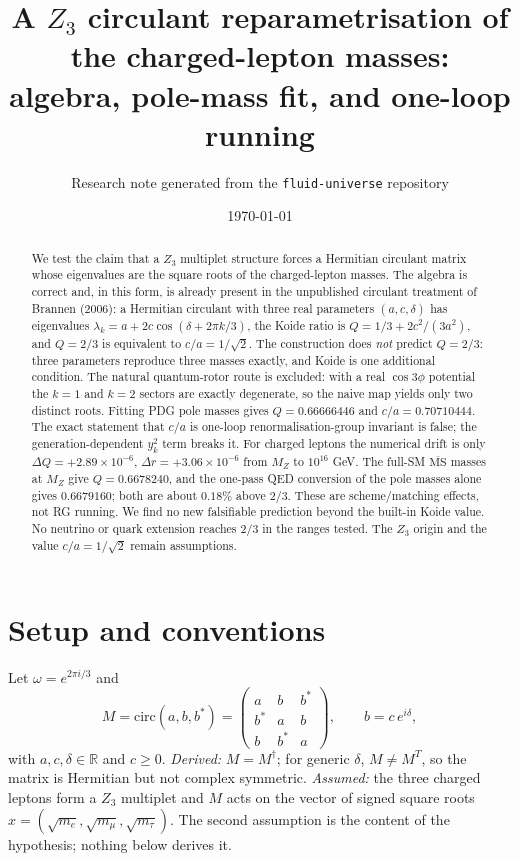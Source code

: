 \documentclass[11pt]{article}
\title{A $Z_3$ circulant reparametrisation of the charged-lepton masses:\\
algebra, pole-mass fit, and one-loop running}
\author{Research note generated from the \texttt{fluid-universe} repository}
\date{\today}
\begin{document}
\maketitle

\begin{abstract}
We test the claim that a $Z_3$ multiplet structure forces a Hermitian circulant
matrix whose eigenvalues are the square roots of the charged-lepton masses.
The algebra is correct and, in this form, is already present in the unpublished
circulant treatment of Brannen (2006): a Hermitian circulant with three real
parameters $(a,c,\delta)$ has eigenvalues
$\lambda_k=a+2c\cos(\delta+2\pi k/3)$, the Koide ratio is
$Q=1/3+2c^2/(3a^2)$, and $Q=2/3$ is equivalent to $c/a=1/\sqrt2$.
The construction does \emph{not} predict $Q=2/3$: three parameters reproduce
three masses exactly, and Koide is one additional condition. The natural
quantum-rotor route is excluded: with a real $\cos3\phi$ potential the $k=1$
and $k=2$ sectors are exactly degenerate, so the naive map yields only two
distinct roots. Fitting PDG pole
masses gives $Q=0.66666446$ and $c/a=0.70710444$. The exact statement that
$c/a$ is one-loop renormalisation-group invariant is false; the
generation-dependent $y_k^2$ term breaks it. For charged leptons the numerical
drift is only $\Delta Q=+2.89\times10^{-6}$, $\Delta r=+3.06\times10^{-6}$ from
$M_Z$ to $10^{16}$ GeV. The full-SM $\overline{\mathrm{MS}}$ masses at $M_Z$
give $Q=0.6678240$, and the one-pass QED conversion of the pole masses alone
gives $0.6679160$; both are about $0.18\%$ above $2/3$. These are
scheme/matching effects, not RG running. We find no new falsifiable prediction beyond the built-in Koide
value. No neutrino or quark extension reaches $2/3$ in the ranges tested. The
$Z_3$ origin and the value $c/a=1/\sqrt2$ remain assumptions.
\end{abstract}

\section{Setup and conventions}
\label{sec:setup}

Let $\omega=e^{2\pi i/3}$ and
\begin{equation}
M=\mathrm{circ}(a,b,b^*)
=\begin{pmatrix}
a & b & b^*\\
b^* & a & b\\
b & b^* & a
\end{pmatrix},
\qquad b=c\,e^{i\delta},
\label{eq:M}
\end{equation}
with $a,c,\delta\in\mathbb{R}$ and $c\ge0$. \emph{Derived:} $M=M^\dagger$; for
generic $\delta$, $M\ne M^T$, so the matrix is Hermitian but not complex
symmetric. \emph{Assumed:} the three charged leptons form a $Z_3$ multiplet and
$M$ acts on the vector of signed square roots
$x=(\sqrt{m_e},\sqrt{m_\mu},\sqrt{m_\tau})$. The second assumption is the
content of the hypothesis; nothing below derives it.
\end{document}
